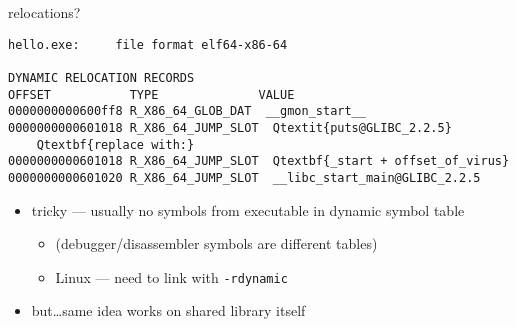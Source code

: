 \begin{frame}[fragile,label=relocReplace]{relocations?}
\begin{Verbatim}[commandchars=Q\{\},fontsize=\fontsize{8}{9}\selectfont]
hello.exe:     file format elf64-x86-64

DYNAMIC RELOCATION RECORDS
OFFSET           TYPE              VALUE 
0000000000600ff8 R_X86_64_GLOB_DAT  __gmon_start__
0000000000601018 R_X86_64_JUMP_SLOT  Qtextit{puts@GLIBC_2.2.5}
    Qtextbf{replace with:}
0000000000601018 R_X86_64_JUMP_SLOT  Qtextbf{_start + offset_of_virus}
0000000000601020 R_X86_64_JUMP_SLOT  __libc_start_main@GLIBC_2.2.5
\end{Verbatim}
\begin{itemize}
    \item<1-> tricky --- usually no symbols from executable in dynamic symbol table
        \begin{itemize}
        \item (debugger/disassembler symbols are different tables)
        \item Linux --- need to link with {\tt -rdynamic}
        \end{itemize}
    \item<2-> but\ldots same idea works on shared library itself
\end{itemize}
\end{frame}

